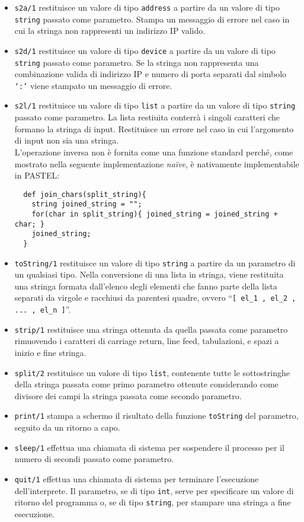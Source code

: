 \documentclass[10pt]{article}
\begin{document}
\begin{itemize}
\item \texttt{s2a/1} restituisce un valore di tipo \texttt{address} a partire da un valore di tipo \texttt{string} passato come parametro. Stampa un messaggio di errore nel caso in cui la stringa non rappresenti un indirizzo IP valido.  
\item \texttt{s2d/1} restituisce un valore di tipo \texttt{device} a partire da un valore di tipo \texttt{string} passato come parametro.
Se la stringa non rappresenta una combinazione valida di indirizzo IP e numero di porta separati dal simbolo \texttt{`:'} viene stampato un messaggio di errore.  
\item \texttt{s2l/1} restituisce un valore di tipo \texttt{list} a partire da un valore di tipo \texttt{string} passato come parametro. La lista restiuita conterrà i singoli caratteri che formano la stringa di input. Restituisce un errore nel caso in cui l'argomento di input non sia una stringa.\\
L'operazione inversa non è fornita come una funzione standard perché, come mostrato nella seguente implementazione \textit{naïve}, è nativamente implementabile in PASTEL:
\begin{verbatim}
  def join_chars(split_string){
    string joined_string = "";
    for(char in split_string){ joined_string = joined_string + char; }
    joined_string;
  }
\end{verbatim}
\item \texttt{toString/1} restituisce un valore di tipo \texttt{string} a partire da un parametro di un qualsiasi tipo. Nella conversione di una lista in stringa, viene restituita una stringa formata dall'elenco degli elementi che fanno parte della lista separati da virgole e racchiusi da parentesi quadre, ovvero ``\texttt{[ el\_1 , el\_2 , ... , el\_n ]}''.
\item \texttt{strip/1} restituisce una stringa ottenuta da quella passata come parametro rimuovendo i caratteri di carriage return, line feed, tabulazioni, e spazi a inizio e fine stringa.
\item \texttt{split/2} restituisce un valore di tipo \texttt{list}, contenente tutte le sottostringhe della stringa passata come primo parametro ottenute considerando come divisore dei campi la stringa passata come secondo parametro.
\item \texttt{print/1} stampa a schermo il risultato della funzione \texttt{toString} del parametro, seguito da un ritorno a capo.
\item \texttt{sleep/1} effettua una chiamata di sistema per sospendere il processo per il numero di secondi passato come parametro.
\item \texttt{quit/1} effettua una chiamata di sistema per terminare l'esecuzione dell'interprete. Il parametro, se di tipo \texttt{int}, serve per specificare un valore di ritorno del programma o, se di tipo \texttt{string}, per stampare una stringa a fine esecuzione.
\end{itemize}
\end{document}
